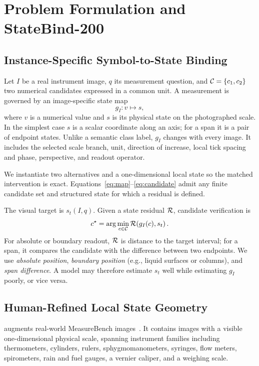 \section{Problem Formulation and StateBind-200}
\label{sec:data}

\subsection{Instance-Specific Symbol-to-State Binding}

Let $I$ be a real instrument image, $q$ its measurement question, and $\mathcal{C}=\{c_1,c_2\}$ two numerical candidates expressed in a common unit. A measurement is governed by an image-specific state map
\begin{equation}
  g_I : v \mapsto s,
  \label{eq:map}
\end{equation}
where $v$ is a numerical value and $s$ is its physical state on the photographed scale. In the simplest case $s$ is a scalar coordinate along an axis; for a span it is a pair of endpoint states. Unlike a semantic class label, $g_I$ changes with every image. It includes the selected scale branch, unit, direction of increase, local tick spacing and phase, perspective, and readout operator.

We instantiate two alternatives and a one-dimensional local state so the matched intervention is exact. Equations~\eqref{eq:map}--\eqref{eq:candidate} admit any finite candidate set and structured state for which a residual is defined.

The visual target is $s_t(I,q)$. Given a state residual $\mathcal{R}$, candidate verification is
\begin{equation}
  c^\star = \arg\min_{c\in\mathcal{C}} \mathcal{R}\!\left(g_I(c),s_t\right).
  \label{eq:candidate}
\end{equation}
For absolute or boundary readout, $\mathcal{R}$ is distance to the target interval; for a span, it compares the candidate with the difference between two endpoints. We use \emph{absolute position}, \emph{boundary position} (e.g., liquid surfaces or columns), and \emph{span difference}. A model may therefore estimate $s_t$ well while estimating $g_I$ poorly, or vice versa.

\subsection{Human-Refined Local State Geometry}

\dataset{} augments real-world MeasureBench images~\cite{lin2026measurebench}. It contains \DatasetImages{} images with a visible one-dimensional physical scale, spanning \DatasetFamilies{} instrument families including thermometers, cylinders, rulers, sphygmomanometers, syringes, flow meters, spirometers, rain and fuel gauges, a vernier caliper, and a weighing scale.


